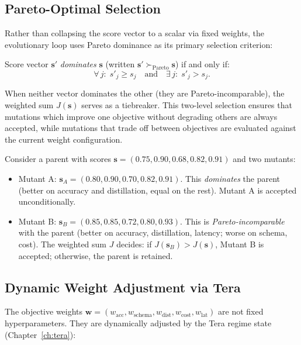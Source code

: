 \subsection{Pareto-Optimal Selection}

Rather than collapsing the score vector to a scalar via fixed weights, the evolutionary loop uses Pareto dominance as its primary selection criterion:

\begin{definition}
Score vector $\mathbf{s}'$ \emph{dominates} $\mathbf{s}$ (written $\mathbf{s}' \succ_{\text{Pareto}} \mathbf{s}$) if and only if:
\begin{equation}
\forall\, j:\; s'_j \geq s_j \quad \text{and} \quad \exists\, j:\; s'_j > s_j.
\end{equation}
\end{definition}

When neither vector dominates the other (they are Pareto-incomparable), the weighted sum $J(\mathbf{s})$ serves as a tiebreaker. This two-level selection ensures that mutations which improve one objective without degrading others are always accepted, while mutations that trade off between objectives are evaluated against the current weight configuration.

\begin{example}
Consider a parent with scores $\mathbf{s} = (0.75, 0.90, 0.68, 0.82, 0.91)$ and two mutants:
\begin{itemize}[leftmargin=1.5em]
  \item Mutant A: $\mathbf{s}_A = (0.80, 0.90, 0.70, 0.82, 0.91)$. This \emph{dominates} the parent (better on accuracy and distillation, equal on the rest). Mutant A is accepted unconditionally.
  \item Mutant B: $\mathbf{s}_B = (0.85, 0.85, 0.72, 0.80, 0.93)$. This is \emph{Pareto-incomparable} with the parent (better on accuracy, distillation, latency; worse on schema, cost). The weighted sum $J$ decides: if $J(\mathbf{s}_B) > J(\mathbf{s})$, Mutant B is accepted; otherwise, the parent is retained.
\end{itemize}
\end{example}

\subsection{Dynamic Weight Adjustment via Tera}

The objective weights $\mathbf{w} = (w_{\text{acc}}, w_{\text{schema}}, w_{\text{dist}}, w_{\text{cost}}, w_{\text{lat}})$ are not fixed hyperparameters. They are dynamically adjusted by the Tera regime state (Chapter~\ref{ch:tera}):


